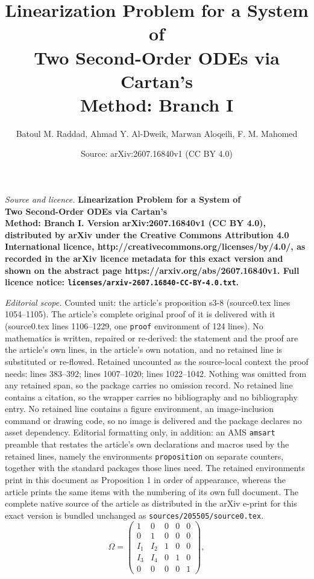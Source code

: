 \documentclass[10pt,a4paper]{amsart}
\title{\Large\bfseries Linearization Problem for a System of \\Two Second-Order ODEs via Cartan's \\Method: Branch I}
\author{Batoul M. Raddad, Ahmad Y. Al-Dweik, Marwan Aloqeili, F. M. Mahomed}
\date{Source: arXiv:2607.16840v1 (CC BY 4.0)}
\begin{document}
\maketitle

\noindent\emph{Source and licence.} \Large\bfseries Linearization Problem for a System of \\Two Second-Order ODEs via Cartan's \\Method: Branch I. Version arXiv:2607.16840v1 (CC BY 4.0), distributed by arXiv under the Creative Commons Attribution 4.0 International licence, http://creativecommons.org/licenses/by/4.0/, as recorded in the arXiv licence metadata for this exact version and shown on the abstract page https://arxiv.org/abs/2607.16840v1. Full licence notice: \texttt{licenses/arxiv-2607.16840-CC-BY-4.0.txt}.\par\smallskip

\noindent\textit{Editorial scope.} Counted unit: the article's proposition s3-8 (source0.tex lines 1054--1105). The article's complete original proof of it is delivered with it (source0.tex lines 1106--1229, one \texttt{proof} environment of 124 lines). No mathematics is written, repaired or re-derived: the statement and the proof are the article's own lines, in the article's own notation, and no retained line is substituted or re-flowed.  Retained uncounted as the source-local context the proof needs: lines 383--392; lines 1007--1020; lines 1022--1042.  Nothing was omitted from any retained span, so the package carries no omission record.  No retained line contains a citation, so the wrapper carries no bibliography and no bibliography entry.  No retained line contains a figure environment, an image-inclusion command or drawing code, so no image is delivered and the package declares no asset dependency.  Editorial formatting only, in addition: an AMS \texttt{amsart} preamble that restates the article's own declarations and macros used by the retained lines, namely the environments \texttt{proposition} on separate counters, together with the standard packages those lines need.  The retained environments print in this document as Proposition 1 in order of appearance, whereas the article prints the same items with the numbering of its own full document.  The complete native source of the article as distributed in the arXiv e-print for this exact version is bundled unchanged as \texttt{sources/205505/source0.tex}.
\begin{equation}\label{87}
\Omega=
\begin{pmatrix}
1&0&0&0&0\\
0&1&0&0&0\\
I_1&I_2&1&0&0\\
I_3&I_4&0&1&0\\
0&0&0&0&1
\end{pmatrix},
\end{equation}
\end{document}
